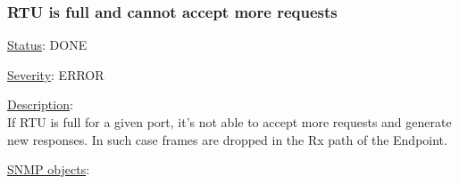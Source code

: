 \subsubsection{\bf RTU is full and cannot accept more requests}
		\label{fail:data:rtu_full}
		\begin{pck_descr}
			\item [] \underline{Status}: DONE
			\item [] \underline{Severity}: ERROR
			\item [] \underline{Description}:\\
				If RTU is full for a given port, it's not able to accept more requests
				and generate new responses. In such case frames are dropped in the
				Rx path of the Endpoint.
			\item [] \underline{SNMP objects}:\\
        {\footnotesize
				 \\
				\\
				\\
         }
		\end{pck_descr}

